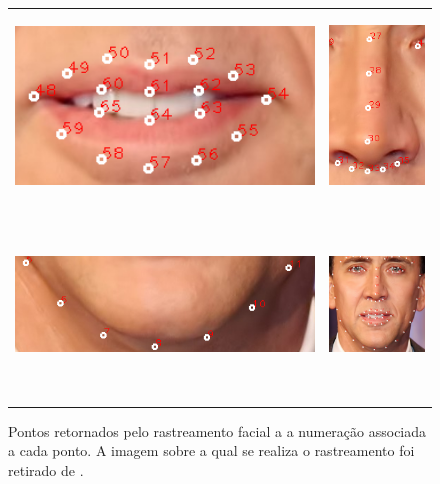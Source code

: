 \begin{figure}
\begin{tabular}{cc}
\includegraphics[width=0.4\linewidth, height=5cm]{figs/nick-marked-mouth.png} &
\includegraphics[width=0.4\linewidth, height=5cm]{figs/nick-marked-nose.png} \\
\includegraphics[width=0.4\linewidth, height=5cm]{figs/nick-marked-queixo.png} &
\includegraphics[width=0.4\linewidth, height=5cm]{figs/nick-marked.png}
\end{tabular}
\caption{Pontos retornados pelo rastreamento facial a a numeração associada a cada ponto. A imagem sobre a qual se realiza o rastreamento foi retirado de \cite{nicolas}.}
\label{fig:tracked-facial-points}
\end{figure}


